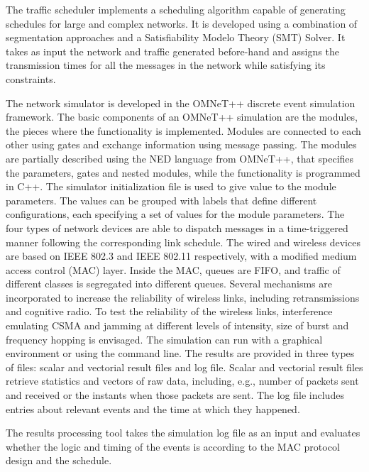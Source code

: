 \documentclass[conference]{IEEEtran}
\begin{document}
The traffic scheduler implements a scheduling algorithm capable of generating schedules for large and complex networks. It is developed using a combination of segmentation approaches and a Satisfiability Modelo Theory (SMT) Solver. It takes as input the network and traffic generated before-hand and assigns the transmission times for all the messages in the network while satisfying its constraints.

The network simulator is developed in the OMNeT++ discrete event simulation framework. The basic components of an OMNeT++ simulation are the modules, the pieces where the functionality is implemented. Modules are connected to each other using gates and exchange information using message passing. The modules are partially described using the NED language from OMNeT++, that specifies the parameters, gates and nested modules, while the functionality is programmed in C++. The simulator initialization file is used to give value to the module parameters. The values can be grouped with labels that define different configurations, each specifying a set of values for the module parameters. The four types of network devices are able to dispatch messages in a time-triggered manner following the corresponding link schedule. The wired and wireless devices are based on IEEE 802.3 and IEEE 802.11 respectively, with a modified medium access control (MAC) layer. Inside the MAC, queues are FIFO, and traffic of different classes is segregated into different queues. Several mechanisms are incorporated to increase the reliability of wireless links, including retransmissions and cognitive radio. To test the reliability of the wireless links, interference emulating CSMA and jamming at different levels of intensity, size of burst and frequency hopping is envisaged. The simulation can run with a graphical environment or using the command line. The results are provided in three types of files: scalar and vectorial result files and log file. Scalar and vectorial result files retrieve statistics and vectors of raw data, including, e.g., number of packets sent and received or the instants when those packets are sent. The log file includes entries about relevant events and the time at which they happened.

The results processing tool takes the simulation log file as an input and evaluates whether the logic and timing of the events is according to the MAC protocol design and the schedule.

\end{document}
